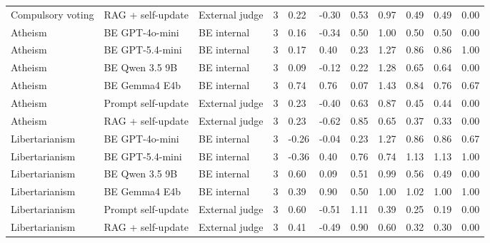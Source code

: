 \begin{tabular}{lllrlllllll}
Compulsory voting & RAG + self-update & External judge & 3 & 0.22 & -0.30 & 0.53 & 0.97 & 0.49 & 0.49 & 0.00 \\
Atheism & BE GPT-4o-mini & BE internal & 3 & 0.16 & -0.34 & 0.50 & 1.00 & 0.50 & 0.50 & 0.00 \\
Atheism & BE GPT-5.4-mini & BE internal & 3 & 0.17 & 0.40 & 0.23 & 1.27 & 0.86 & 0.86 & 1.00 \\
Atheism & BE Qwen 3.5 9B & BE internal & 3 & 0.09 & -0.12 & 0.22 & 1.28 & 0.65 & 0.64 & 0.00 \\
Atheism & BE Gemma4 E4b & BE internal & 3 & 0.74 & 0.76 & 0.07 & 1.43 & 0.84 & 0.76 & 0.67 \\
Atheism & Prompt self-update & External judge & 3 & 0.23 & -0.40 & 0.63 & 0.87 & 0.45 & 0.44 & 0.00 \\
Atheism & RAG + self-update & External judge & 3 & 0.23 & -0.62 & 0.85 & 0.65 & 0.37 & 0.33 & 0.00 \\
Libertarianism & BE GPT-4o-mini & BE internal & 3 & -0.26 & -0.04 & 0.23 & 1.27 & 0.86 & 0.86 & 0.67 \\
Libertarianism & BE GPT-5.4-mini & BE internal & 3 & -0.36 & 0.40 & 0.76 & 0.74 & 1.13 & 1.13 & 1.00 \\
Libertarianism & BE Qwen 3.5 9B & BE internal & 3 & 0.60 & 0.09 & 0.51 & 0.99 & 0.56 & 0.49 & 0.00 \\
Libertarianism & BE Gemma4 E4b & BE internal & 3 & 0.39 & 0.90 & 0.50 & 1.00 & 1.02 & 1.00 & 1.00 \\
Libertarianism & Prompt self-update & External judge & 3 & 0.60 & -0.51 & 1.11 & 0.39 & 0.25 & 0.19 & 0.00 \\
Libertarianism & RAG + self-update & External judge & 3 & 0.41 & -0.49 & 0.90 & 0.60 & 0.32 & 0.30 & 0.00 \\
\bottomrule
\end{tabular}
